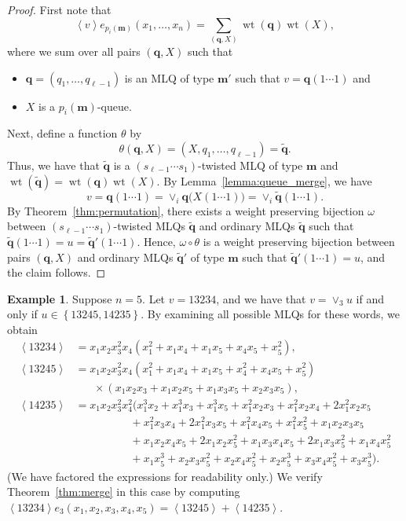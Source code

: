 \documentclass[reqno]{amsart}
\newcommand{\0}{\phantom{c}}
\newcommand{\swt}[1]{\left\langle #1 \right\rangle} %
\newcommand{\merge}[1]{\vee_{#1}} %
\DeclareMathOperator{\wt}{wt} %
\newcommand{\mm}{\mathbf{m}}
\newcommand{\qq}{\mathbf{q}}
\let\sumnonlimits\sum
\renewcommand{\sum}{\sumnonlimits\limits}
\newcommand{\set}[1]{\left\{ #1 \right\}}
\theoremstyle{plain}
\theoremstyle{definition}
\newtheorem{example}[thm]{Example}
\numberwithin{equation}{section}
\begin{document}
\begin{proof}
  First note that
  \[
  \swt{v} e_{p_i(\mm)}(x_1, \dotsc, x_n) = \sum_{(\qq,X)} \wt(\qq) \wt(X),
  \]
  where we sum over all pairs $(\qq, X)$ such that
  \begin{itemize}
  \item $\qq = (q_1, \dotsc, q_{\ell-1})$ is an MLQ of type $\mm'$ such that $v = \qq(1\cdots1)$ and
  \item $X$ is a $p_i(\mm)$-queue.
  \end{itemize}
  Next, define a function $\theta$ by
  \[
  \theta(\qq, X) = (X, q_1, \dotsc, q_{\ell-1}) = \widetilde{\qq}.
  \]
  Thus, we have that $\widetilde{\qq}$ is a $(s_{\ell-1} \dotsm s_1)$-twisted MLQ of type $\mm$ and $\wt(\widetilde{\qq}) = \wt(\qq) \wt(X) $.
  By Lemma~\ref{lemma:queue_merge}, we have
  \[
  v = \qq(1 \dotsm 1) = \merge{i} \qq\bigl( X(1 \dotsm 1) \bigr) = \merge{i} \widetilde{\qq}(1 \dotsm 1).
  \]
  By Theorem~\ref{thm:permutation}, there exists a weight preserving bijection $\omega$ between $(s_{\ell-1} \dotsm s_1)$-twisted MLQs $\widetilde{\qq}$ and ordinary MLQs $\widetilde{\qq}$ such that $\widetilde{\qq}(1 \dotsm 1) = u = \widetilde{\qq}'(1 \dotsm 1)$.
  Hence, $\omega \circ \theta$ is a weight preserving bijection between pairs $(\qq, X)$ and ordinary MLQs $\widetilde{\qq}'$ of type $\mm$ such that $\widetilde{\qq}'(1 \dotsm 1) = u$, and the claim follows.
\end{proof}


\begin{example}
Suppose $n = 5$.
Let $v = 13234$, and we have that $v = \merge{3} u$ if and only if $u \in \set{13245, 14235}$.
By examining all possible MLQs for these words, we obtain
\begin{align*}
\swt{13234} & = x_1 x_2 x_3^2 x_4 (x_1^2 + x_1 x_4 + x_1 x_5 + x_4 x_5 + x_5^2),
\\ \swt{13245} & = x_1 x_2 x_3^2 x_4 (x_1^2 + x_1x_4 + x_1x_5 + x_4^2 + x_4x_5 + x_5^2)
\\ & \hspace{20pt} \times (x_1x_2x_3 + x_1x_2x_5+x_1x_3x_5+x_2x_3x_5),
\\ \swt{14235} & = x_1x_2x_3^2x_4^2 (x_1^3x_2 + x_1^3x_3 + x_1^3x_5 + x_1^2x_2x_3 + x_1^2x_2x_4 + 2x_1^2x_2x_5
\\ & \hspace{60pt} + x_1^2x_3x_4 + 2x_1^2x_3x_5 + x_1^2x_4x_5 + x_1^2x_5^2 + x_1x_2x_3x_5
\\ & \hspace{60pt} + x_1x_2x_4x_5 + 2x_1x_2x_5^2 + x_1x_3x_4x_5 + 2x_1x_3x_5^2 + x_1x_4x_5^2
\\ & \hspace{60pt} + x_1x_5^3 + x_2x_3x_5^2 + x_2x_4x_5^2 + x_2x_5^3 + x_3x_4x_5^2 + x_3x_5^3).
\end{align*}
(We have factored the expressions for readability only.)
We verify Theorem~\ref{thm:merge} in this case by computing $\swt{13234} e_3(x_1, x_2, x_3, x_4, x_5) = \swt{13245} + \swt{14235}$.
\end{example}
\end{document}
